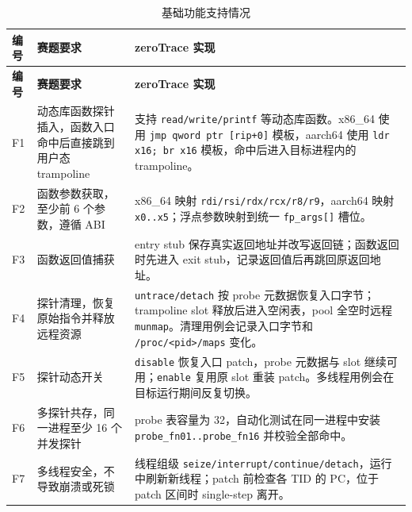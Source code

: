 \documentclass[UTF8,a4paper,11pt,fontset=fandol]{ctexart}
\newcommand{\code}[1]{\texttt{#1}}
\begin{document}
\begin{longtable}{@{}P{1.0cm}P{4.2cm}P{9.95cm}@{}}
\caption{基础功能支持情况}\label{tab:basic-req}\\
\toprule
\textbf{编号} & \textbf{赛题要求} & \textbf{zeroTrace 实现}\\
\midrule
\endfirsthead
\toprule
\textbf{编号} & \textbf{赛题要求} & \textbf{zeroTrace 实现}\\
\midrule
\endhead
F1 & 动态库函数探针插入，函数入口命中后直接跳到用户态 trampoline &
支持 \code{read/write/printf} 等动态库函数。x86\_64 使用 \code{jmp qword ptr [rip+0]} 模板，aarch64 使用 \code{ldr x16; br x16} 模板，命中后进入目标进程内的 trampoline。\\
F2 & 函数参数获取，至少前 6 个参数，遵循 ABI &
x86\_64 映射 \code{rdi/rsi/rdx/rcx/r8/r9}，aarch64 映射 \code{x0..x5}；浮点参数映射到统一 \code{fp\_args[]} 槽位。\\
F3 & 函数返回值捕获 &
entry stub 保存真实返回地址并改写返回链；函数返回时先进入 exit stub，记录返回值后再跳回原返回地址。\\
F4 & 探针清理，恢复原始指令并释放远程资源 &
\code{untrace/detach} 按 probe 元数据恢复入口字节；trampoline slot 释放后进入空闲表，pool 全空时远程 \code{munmap}。清理用例会记录入口字节和 \code{/proc/<pid>/maps} 变化。\\
F5 & 探针动态开关 &
\code{disable} 恢复入口 patch，probe 元数据与 slot 继续可用；\code{enable} 复用原 slot 重装 patch。多线程用例会在目标运行期间反复切换。\\
F6 & 多探针共存，同一进程至少 16 个并发探针 &
probe 表容量为 32，自动化测试在同一进程中安装 \code{probe\_fn01..probe\_fn16} 并校验全部命中。\\
F7 & 多线程安全，不导致崩溃或死锁 &
线程组级 \code{seize/interrupt/continue/detach}，运行中刷新新线程；patch 前检查各 TID 的 PC，位于 patch 区间时 single-step 离开。\\
\bottomrule
\end{longtable}
\end{document}

